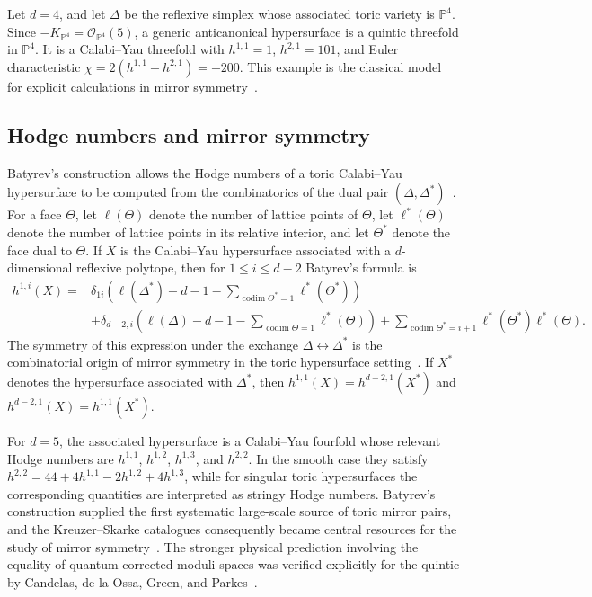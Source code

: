 \documentclass[appliedmath,article,submit,moreauthors]{Definitions/mdpi}
\begin{document}
\begin{Example}
\label{ex:quintic}
Let \(d=4\), and let \(\Delta\) be the reflexive simplex whose associated toric
variety is \(\mathbb{P}^4\). Since
\(-K_{\mathbb{P}^4}=\mathcal{O}_{\mathbb{P}^4}(5)\), a generic anticanonical
hypersurface is a quintic threefold in \(\mathbb{P}^4\). It is a Calabi--Yau
threefold with \(h^{1,1}=1\), \(h^{2,1}=101\), and Euler characteristic
\(\chi=2(h^{1,1}-h^{2,1})=-200\). This example is the classical model for
explicit calculations in mirror symmetry~\cite{Candelas1991}.
\end{Example}

\subsection{Hodge numbers and mirror symmetry}
\label{sec:math-hodge}

Batyrev's construction allows the Hodge numbers of a toric Calabi--Yau
hypersurface to be computed from the combinatorics of the dual pair
\((\Delta,\Delta^*)\)~\cite{Batyrev1994,BatyrevBorisov1996}. For a face
\(\Theta\), let \(\ell(\Theta)\) denote the number of lattice points of
\(\Theta\), let \(\ell^*(\Theta)\) denote the number of lattice points in its
relative interior, and let \(\Theta^*\) denote the face dual to \(\Theta\). If
\(X\) is the Calabi--Yau hypersurface associated with a \(d\)-dimensional
reflexive polytope, then for \(1\leq i\leq d-2\) Batyrev's formula is
\[
\begin{aligned}
h^{1,i}(X)={}&
\delta_{1i}
\left(
\ell(\Delta^*)-d-1-
\sum_{\operatorname{codim}\Theta^*=1}\ell^*(\Theta^*)
\right)
\\
&+
\delta_{d-2,i}
\left(
\ell(\Delta)-d-1-
\sum_{\operatorname{codim}\Theta=1}\ell^*(\Theta)
\right)
+
\sum_{\operatorname{codim}\Theta^*=i+1}
\ell^*(\Theta^*)\ell^*(\Theta).
\end{aligned}
\]
The symmetry of this expression under the exchange
\(\Delta\leftrightarrow\Delta^*\) is the combinatorial origin of mirror symmetry
in the toric hypersurface setting~\cite{Batyrev1994}. If \(X^*\) denotes the
hypersurface associated with \(\Delta^*\), then \(h^{1,1}(X)=h^{d-2,1}(X^*)\)
and \(h^{d-2,1}(X)=h^{1,1}(X^*)\).

For \(d=5\), the associated hypersurface is a Calabi--Yau fourfold whose
relevant Hodge numbers are \(h^{1,1}\), \(h^{1,2}\), \(h^{1,3}\), and
\(h^{2,2}\). In the smooth case they satisfy
\(h^{2,2}=44+4h^{1,1}-2h^{1,2}+4h^{1,3}\), while for singular toric
hypersurfaces the corresponding quantities are interpreted as stringy Hodge
numbers. Batyrev's construction supplied the first systematic large-scale source
of toric mirror pairs, and the Kreuzer--Skarke catalogues consequently became
central resources for the study of mirror
symmetry~\cite{KreuzerSkarke1998,KreuzerSkarke2000,KreuzerCYData}. The stronger
physical prediction involving the equality of quantum-corrected moduli spaces
was verified explicitly for the quintic by Candelas, de la Ossa, Green, and
Parkes~\cite{Candelas1991}.
\end{document}
